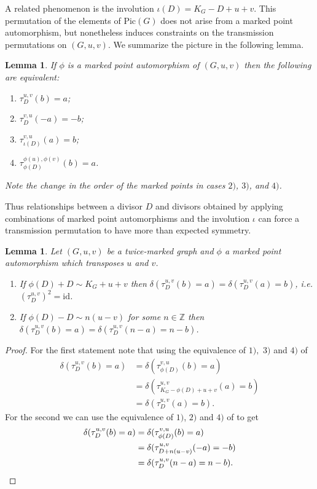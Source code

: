 \documentclass[11pt]{article}
\newtheorem{lemma}[theo]{Lemma}
\theoremstyle{definition}
\numberwithin{equation}{section}
\newcommand{\Z}{\mathbb{Z}}
\newcommand{\pic}[1]{\mathrm{Pic}\left({#1}\right)}
\newcommand{\id}{\mathrm{id}}
\newcommand{\tauD}{\tau^{u,v}_D}
\begin{document}
A related phenomenon is the involution $\iota(D) = K_G-D+u+v$. This permutation of the elements of $\pic{G}$ does not arise from a marked point automorphism, but nonetheless induces constraints on the transmission permutations on $(G,u,v)$. We summarize the picture in the following lemma.

\begin{lemma}\label{lem:mpIds}
    If $\phi$ is a marked point automorphism of $(G,u,v)$ then the following are equivalent:
    \begin{enumerate}[label = \arabic*)]
        \item $\tauD(b) = a$;
        \item $\tau_D^{v,u}(-a) = -b$;
        \item $\tau_{\iota(D)}^{v,u}(a) = b$;
        \item $\tau_{\phi(D)}^{\phi(u),\phi(v)}(b) = a$.
    \end{enumerate}
    Note the change in the order of the marked points in cases $2)$, $3)$, and $4)$.
\end{lemma}

Thus relationships between a divisor $D$ and divisors obtained by applying combinations of marked point automorphisms and the involution $\iota$ can force a transmission permutation to have more than expected symmetry.

\begin{lemma}\label{lem-tauSyms}
    Let $(G,u,v)$ be a twice-marked graph and $\phi$ a marked point automorphism which transposes $u$ and $v$.
    \begin{enumerate}[label = \arabic*)]
        \item If $\phi(D) + D \sim K_G + u+v$ then $\delta(\tauD(b) = a) = \delta(\tauD(a) = b)$, i.e. $\left(\tauD\right)^2 = \id$.
        \item If $\phi(D) -D \sim n(u-v)$ for some $n \in \Z$ then $\delta(\tauD(b) = a)=\delta(\tauD(n-a) = n-b)$.
    \end{enumerate}
\end{lemma}

\begin{proof}
    For the first statement note that using the equivalence of $1),$ $3)$ and $4)$ of 
    \begin{align*}
        \delta(\tauD(b) = a) &= \delta(\tau_{\phi(D)}^{v,u}(b) = a)\\
        &=\delta(\tau_{K_G-\phi(D)+u+v}^{u,v}(a) = b)\\
        &=\delta(\tau_{D}^{u,v}(a) = b).
    \end{align*}
    For the second we can use the equivalence of $1)$, $2)$ and $4)$ of  to get
    \begin{align*}
        \delta(\tauD(b) = a) & = \delta(\tau_{\phi(D)}^{v,u}(b) = a)\\
        &=\delta(\tau_{D+n(u-v)}^{u,v}(-a) = -b)\\
        &=\delta(\tau_{D}^{u,v}(n-a) = n-b). \qedhere
    \end{align*}
\end{proof}
\end{document}
